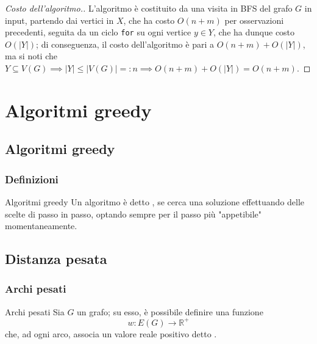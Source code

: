 \documentclass[a4paper, 12pt]{report}
\begin{document}
    \begin{proof}[Costo dell'algoritmo.]
        L'algoritmo è costituito da una visita in BFS del grafo $G$ in input, partendo dai vertici in $X$, che ha costo $O(n + m)$ per osservazioni precedenti, seguita da un ciclo \texttt{for} su ogni vertice $y \in Y$, che ha dunque costo $O(|Y|)$; di conseguenza, il costo dell'algoritmo è pari a $O(n + m) + O(|Y|)$, ma si noti che $Y \subseteq V(G) \implies |Y| \le |V(G)| =: n \implies O(n + m) + O(|Y|) = O(n + m)$.
    \end{proof}

    \chapter{Algoritmi greedy}

    \section{Algoritmi greedy}

    \subsection{Definizioni}

    \begin{frameddefn}{Algoritmi greedy}
        Un algoritmo è detto , se cerca una soluzione effettuando delle scelte di passo in passo, optando sempre per il passo più "appetibile" momentaneamente.
    \end{frameddefn}

    \section{Distanza pesata}

    \subsection{Archi pesati}

    \begin{frameddefn}{Archi pesati}
        Sia $G$ un grafo; su esso, è possibile definire una funzione $$w: E(G) \rightarrow \mathbb{R}^+$$ che, ad ogni arco, associa un valore reale positivo detto .
    \end{frameddefn}
\end{document}
